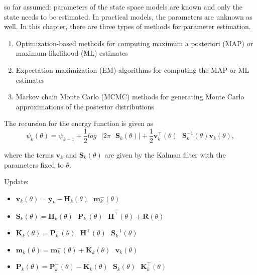 so far assumed: parameters of the state space models are known and only the state needs to be estimated. In practical models, the parameters are unknown as well. In this chapter, there are three types of methods for parameter estimation. 
\begin{enumerate}
    \item Optimization-based methods for computing maximum a posteriori (MAP) or maximum likelihood (ML) estimates
    \item Expectation-maximization (EM) algorithms for computing the MAP or ML estimates
    \item Markov chain Monte Carlo (MCMC) methods for generating Monte Carlo approximations of the posterior distributions
\end{enumerate}
\begin{theorem}
    The recursion for the energy function is given as 
    \[\psi_k(\theta) = \psi_{k-1} + \frac{1}{2}log\textbf{ }|2\pi\textbf{ 
    }\mathbf{S}_k(\theta)| + \frac{1}{2}\mathbf{v}_k^\intercal(\theta)\textbf{ }\mathbf{S}_k^{-1}(\theta)\mathbf{v}_k(\theta), \]

    where the terms $\mathbf{v}_k$ and $\mathbf{S}_k(\theta)$ are given by the Kalman filter with the parameters fixed to $\theta$.
        \item Update: 
            \begin{itemize}
                \item[] $\mathbf{v}_k(\theta)=\mathbf{y}_k - \mathbf{H}_k(\theta)\textbf{ }\mathbf{m}_k^-(\theta)$
                \item[] $\mathbf{S}_k(\theta)= \mathbf{H}_k(\theta) \textbf{ } \mathbf{P}_k^-(\theta)\textbf{ }\mathbf{H}^\intercal(\theta)+\mathbf{R}(\theta)$
                \item[] $\mathbf{K}_k(\theta)= \mathbf{P}_k^-(\theta)\textbf{ }\mathbf{H}^\intercal(\theta)\textbf{ }\mathbf{S}_k^{-1}(\theta)$
                \item[] $\mathbf{m}_k(\theta)=\mathbf{m}_k^-(\theta)+\mathbf{K}_k(\theta)\textbf{ }\mathbf{v}_k(\theta)$
                \item[] $\mathbf{P}_k(\theta)=\mathbf{P}_k^-(\theta)- \mathbf{K}_k(\theta)\textbf{ }\mathbf{S}_k(\theta)\textbf{ }\mathbf{K}_k^\intercal(\theta)$
    \end{itemize}        
\end{theorem}

